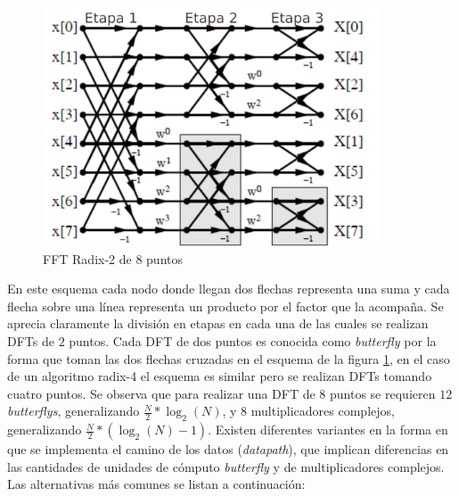 \begin{figure}[htb!]
        \centering
        \includegraphics[width=10cm]{./figures/r2_8.png}
        \caption{FFT Radix-2 de 8 puntos}
        \label{fig:r2_8}
\end{figure}

En este esquema cada nodo donde llegan dos flechas representa una suma y cada flecha sobre una línea
representa un producto por el factor que la acompaña. Se aprecia claramente la división en etapas
en cada una de las cuales se realizan DFTs de $2$ puntos. Cada DFT de dos puntos es conocida como
\textit{butterfly} por la forma que toman las dos flechas cruzadas en el esquema de la figura
\ref{fig:r2_8}, en el caso de un algoritmo radix-4 el esquema es similar pero se realizan DFTs
tomando cuatro puntos. Se observa que para realizar una DFT de $8$ puntos se requieren $12$
\textit{butterflys}, generalizando $\frac{N}{2}*\log_2(N)$, y $8$ multiplicadores complejos,
generalizando $\frac{N}{2}*(\log_2(N)-1)$.
% 
Existen diferentes variantes en la forma en que se implementa el camino de los datos
(\textit{datapath}), que implican diferencias en las cantidades de unidades de cómputo
\textit{butterfly} y de multiplicadores complejos. Las alternativas más comunes se listan a
continuación:

